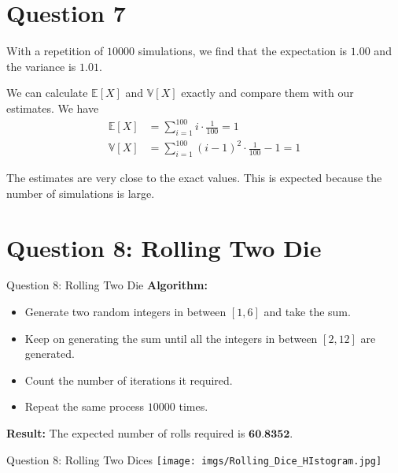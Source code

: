 \documentclass[compress,12pt]{beamer}
\begin{document}
\section{Question 7}
\begin{frame}

With a repetition of $10000$ simulations, we find that {\color{red}the expectation is $1.00$} and {\color{red}the variance is $1.01$}.


We can calculate $\mathbb{E}[X]$ and $\mathbb{V}[X]$ exactly and compare them with our estimates. We have
\begin{align*}
    \mathbb{E}[X] &= \sum_{i=1}^{100} i \cdot \frac{1}{100} = 1 \\
    \mathbb{V}[X] &= \sum_{i=1}^{100} (i - 1)^2 \cdot \frac{1}{100} - 1 = 1
\end{align*}

{\color{red}The estimates are very close to the exact values.} This is expected because the number of simulations is large.
\end{frame}

\section{Question 8: Rolling Two Die}

\begin{frame}{Question 8: Rolling Two Die}
    \textbf{Algorithm:}
    \begin{itemize}
        \item Generate two random integers in between $[1,6]$ and take the sum.
        \item Keep on generating the sum until all the integers in between $[2,12]$ are generated.
        \item Count the number of iterations it required.
        \item Repeat the same process $10000$ times.
    \end{itemize}
    \textbf{Result:} The expected number of rolls required is $\textbf{60.8352}$.
\end{frame}

\begin{frame}{Question 8: Rolling Two Dices}
\centering
\texttt{[image: imgs/Rolling\_Dice\_HIstogram.jpg]}  
\end{frame}
\end{document}
